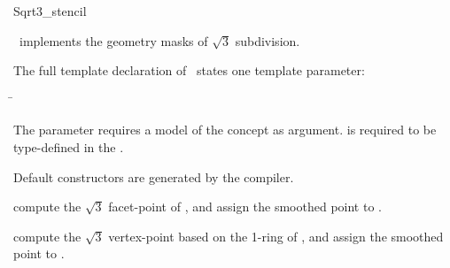 \begin{ccRefClass}{Sqrt3_stencil}

\ccDefinition

\ccClassTemplateName\ implements the geometry masks 
of $\sqrt{3}$ subdivision. 


\ccParameters

The full template declaration of \ccClassTemplateName\ states one
template parameter:

\begin{tabbing}
 \= 
\end{tabbing}
   
The  parameter requires a model of 
the  concept as argument. 
 is required to be type-defined in the 
.

\ccCreation

Default constructors are generated by the compiler.

\ccThree{}{}{}

{compute the $\sqrt{3}$ facet-point of , and assign 
the smoothed point to .}

{compute the $\sqrt{3}$ vertex-point based on the 1-ring of , 
and assign the smoothed point to .}


\ccSeeAlso

\\
\\
\\

\end{ccRefClass}

\ccRefPageEnd


